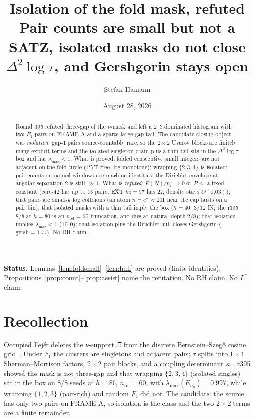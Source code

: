 \documentclass[11pt]{article}
\title{\bfseries Isolation of the fold mask, refuted\\[2mm]
\large Pair counts are small but not a SATZ, isolated masks
do not close $\Delta^2\log\tau$, and Gershgorin stays open}
\author{Stefan Hamann}
\date{August 28, 2026}
\theoremstyle{remark}
\begin{document}
\maketitle

\begin{abstract}\noindent
Round 395 refuted three-gap of the $\nu$-mask and left a
$2$--$3$ dominated histogram with two $F_1$ pairs on FRAME-A
and a sparse large-gap tail.  The candidate closing object was
\emph{isolation}: gap-$1$ pairs source-countably rare, so the
$2\times2$ Uvarov blocks are finitely many explicit terms and
the isolated singleton chain plus a thin tail sits in the
$\Delta^2\log\tau$ box and has $\lambda_{\max}<1$.
What is proved: folded consecutive small integers are not
adjacent on the fold circle (PNT-free, log monotone);
wrapping $\{2,3,4\}$ is isolated; pair counts on named windows
are machine identities; the Dirichlet envelope at angular
separation $2$ is still $\gg 1$.
What is \emph{refuted}: $P(N)/n_\nu\to 0$ or $P\le$ a fixed
constant (core-$42$ has up to $16$ pairs, EXT $kz=97$ has $22$,
density stays $O(0.03)$); that pairs are small-$n$ log
collisions (an atom $n=e^{u}\approx 211$ near the cap lands on
a pair bin); that isolated masks with a thin tail imply the
box ($h=40$: $3/12$ IN; the r395 $8/8$ at $h=80$ is an
$n_{\mathrm{ref}}=60$ truncation, and dies at natural depth
$2/8$); that isolation implies $\lambda_{\max}<1$ ($1010$);
that isolation plus the Dirichlet hull closes Gershgorin
($\mathrm{gersh}=1.77$).  No RH claim.
\end{abstract}

\medskip\noindent
\textbf{Status.}\enspace
Lemmas~\ref{lem:foldsmall}--\ref{lem:hull} are proved (finite
identities).
Propositions~\ref{prop:count}--\ref{prop:assist} name the
refutation.  No RH claim.  No $L^*$ claim.

\section{Recollection}\label{sec:rec}

Occupied Fej\'er deletes the $\nu$-support $\Xi$ from the
discrete Bernstein--Szeg\H{o} cosine grid~\cite{r393,r395}.
Under $F_1$ the clusters are singletons and adjacent pairs;
$\tau$ splits into $1\times1$ Sherman--Morrison factors,
$2\times2$ pair blocks, and a coupling determinant
$\kappa$~\cite{r393}.
r395 showed the mask is not three-gap and that wrapping
$\{2,3,4\}$ (isolated singles) sat in the box on $8/8$ seeds
at $h=80$, $n_{\mathrm{ref}}=60$, with
$\lambda_{\max}(E_{n_0})=0.997$, while wrapping $\{1,2,3\}$
(pair-rich) and random $F_1$ did not.
The candidate: the source has only two pairs on FRAME-A, so
isolation is the class and the two $2\times2$ terms are a
finite remainder.
\end{document}
